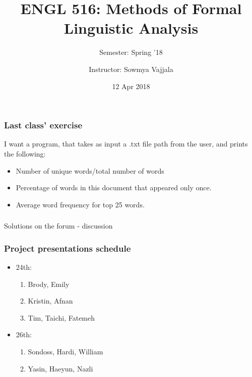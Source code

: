 \documentclass{beamer}
\author[Sowmya Vajjala]{Instructor: Sowmya Vajjala}
\title[ENGL 516]{ENGL 516: Methods of Formal Linguistic Analysis}
\subtitle{Semester: Spring '18}
\date{12 Apr 2018}
\institute{Iowa State University, USA}
\begin{document}
\begin{frame}\titlepage
\end{frame}

\begin{frame}
\frametitle{Last class' exercise}
I want a program, that takes as input a .txt file path from the user, and prints the following: 
\begin{itemize}
\item Number of unique words/total number of words
\item Percentage of words in this document that appeared only once.
\item Average word frequency for top 25 words.
\end{itemize}
\end{frame}

\begin{frame}
\frametitle{}
\Large Solutions on the forum - discussion
\end{frame}

\begin{frame}
\frametitle{Project presentations schedule}
\begin{itemize}
\item 24th: 
\begin{enumerate}
\item Brody, Emily
\item Kristin, Afnan
\item Tim, Taichi, Fatemeh
\end{enumerate}
\item 26th:
\begin{enumerate}
\item Sondoss, Hardi, William
\item Yasin, Haeyun, Nazli
\end{enumerate}
\end{itemize}
\end{frame}
\end{document}
